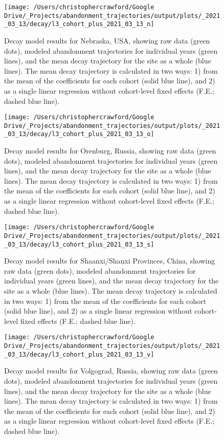 \documentclass[
]{article}
\begin{document}
\begin{figure}
\texttt{[image: /Users/christophercrawford/Google Drive/\_Projects/abandonment\_trajectories/output/plots/\_2021\_03\_13/decay/l3\_cohort\_plus\_2021\_03\_13\_n]} \caption{Decay model results for Nebraska, USA, showing raw data (green dots), modeled abandonment trajectories for individual years (green lines), and the mean decay trajectory for the site as a whole (blue lines). The mean decay trajectory is calculated in two ways: 1) from the mean of the coefficients for each cohort (solid blue line), and 2) as a single linear regression without cohort-level fixed effects (F.E.; dashed blue line).}\label{fig:decay-model-indiv-site-n}
\end{figure}

\begin{figure}
\texttt{[image: /Users/christophercrawford/Google Drive/\_Projects/abandonment\_trajectories/output/plots/\_2021\_03\_13/decay/l3\_cohort\_plus\_2021\_03\_13\_o]} \caption{Decay model results for Orenburg, Russia, showing raw data (green dots), modeled abandonment trajectories for individual years (green lines), and the mean decay trajectory for the site as a whole (blue lines). The mean decay trajectory is calculated in two ways: 1) from the mean of the coefficients for each cohort (solid blue line), and 2) as a single linear regression without cohort-level fixed effects (F.E.; dashed blue line).}\label{fig:decay-model-indiv-site-o}
\end{figure}

\begin{figure}
\texttt{[image: /Users/christophercrawford/Google Drive/\_Projects/abandonment\_trajectories/output/plots/\_2021\_03\_13/decay/l3\_cohort\_plus\_2021\_03\_13\_s]} \caption{Decay model results for Shaanxi/Shanxi Provinces, China, showing raw data (green dots), modeled abandonment trajectories for individual years (green lines), and the mean decay trajectory for the site as a whole (blue lines). The mean decay trajectory is calculated in two ways: 1) from the mean of the coefficients for each cohort (solid blue line), and 2) as a single linear regression without cohort-level fixed effects (F.E.; dashed blue line).}\label{fig:decay-model-indiv-site-s}
\end{figure}

\begin{figure}
\texttt{[image: /Users/christophercrawford/Google Drive/\_Projects/abandonment\_trajectories/output/plots/\_2021\_03\_13/decay/l3\_cohort\_plus\_2021\_03\_13\_v]} \caption{Decay model results for Volgograd, Russia, showing raw data (green dots), modeled abandonment trajectories for individual years (green lines), and the mean decay trajectory for the site as a whole (blue lines). The mean decay trajectory is calculated in two ways: 1) from the mean of the coefficients for each cohort (solid blue line), and 2) as a single linear regression without cohort-level fixed effects (F.E.; dashed blue line).}\label{fig:decay-model-indiv-site-v}
\end{figure}
\end{document}
